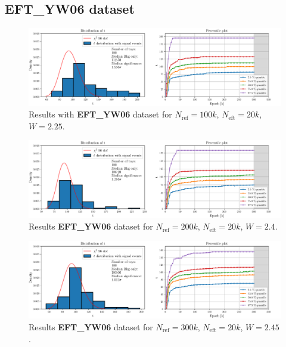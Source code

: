 \subsection*{EFT\_YW06 dataset}
\vspace{-5mm}
\begin{figure}[H]
	\centering
	\includegraphics[width=1.0\textwidth]{Python/RESULTS/ref100000_bkg0_eft20000/data_ref100000_bkg0_eft20000_wclip2-25.pdf}
	\caption{Results with \textbf{EFT\_YW06} dataset for $N_\mathrm{ref}=100\si{k}$, $N_\mathrm{eft}=20\si{k}$, $W=2.25$.}
	\label{fig:REF100000_BKG0_EFT20000_WCLIP2.25}
\end{figure}
\vspace{-5mm}
\begin{figure}[H]
	\centering
	\includegraphics[width=1.0\textwidth]{Python/RESULTS/ref200000_bkg0_eft20000/data_ref200000_bkg0_eft20000_wclip2-4.pdf}
	\caption{Results \textbf{EFT\_YW06} dataset for $N_\mathrm{ref}=200\si{k}$, $N_\mathrm{eft}=20\si{k}$, $W=2.4$.}
	\label{fig:REF200000_BKG0_EFT20000_WCLIP2.4}
\end{figure}
\vspace{-5mm}
\begin{figure}[H]
	\centering
	\includegraphics[width=1.0\textwidth]{Python/RESULTS/ref300000_bkg0_eft20000/data_ref300000_bkg0_eft20000_wclip2-45.pdf}
	\caption{Results \textbf{EFT\_YW06} dataset for $N_\mathrm{ref}=300\si{k}$, $N_\mathrm{eft}=20\si{k}$, $W=2.45$.}
	\label{fig:REF300000_BKG0_EFT20000_WCLIP2.45}
\end{figure}
